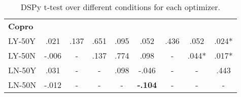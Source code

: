 \begin{table}[h]
\begin{tabular}{lcccc|cccc}
        \midrule
        \textbf{Copro}\\
        \cmidrule(lr){1-9}
        LY-50Y & .021 & .137&.651&.095      & .052 &  .436&.052&.024*   \\ \hline
        LY-50N  & -.006 & -      & .137&.774     & .098 & -      & .044*&.017*   \\ \hline
        LN-50Y  & .031 & -      & -    & .098       & -.046 & -      & -    & .443   \\ \hline
        LN-50N   & -.012 & -      & -    & -           & \textbf{-.104} & -      & -    & -      \\ 
        \hline
    \end{tabular}
    \caption{DSPy t-test over different conditions for each optimizer.}
    \label{tab:dspy-all-conditions-t-test}
\end{table}


